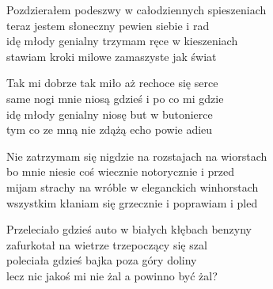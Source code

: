 \begin{text}
    Pozdzierałem podeszwy w całodziennych spieszeniach\\
    teraz jestem słoneczny pewien siebie i rad\\
    idę młody genialny trzymam ręce w kieszeniach\\
    stawiam kroki milowe zamaszyste jak świat

    Tak mi dobrze tak miło aż rechoce się serce\\
    same nogi mnie niosą gdzieś i po co mi gdzie\\
    idę młody genialny niosę but w butonierce\\
    tym co ze mną nie zdążą echo powie adieu

    Nie zatrzymam się nigdzie na rozstajach na wiorstach\\
    bo mnie niesie coś wiecznie notorycznie i przed\\
    mijam strachy na wróble w eleganckich winhorstach\\
    wszystkim kłaniam się grzecznie i poprawiam i pled

    Przeleciało gdzieś auto w białych kłębach benzyny\\
    zafurkotał na wietrze trzepoczący się szal\\
    poleciała gdzieś bajka poza góry doliny\\
    lecz nic jakoś mi nie żal a powinno być żal?
\end{text}
\begin{chord}

\end{chord}